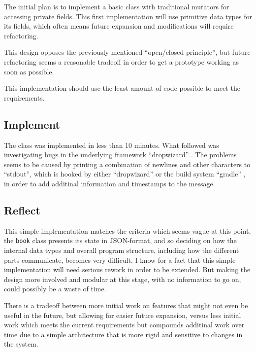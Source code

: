 The initial plan is to implement a basic class with traditional mutators for
accessing private fields. This first implementation will use primitive data
types for its fields, which often means future expansion and modifications will
require refactoring. 

This design opposes the previously mentioned ``open/closed principle'', but
future refactoring seems a reasonable tradeoff in order to get a prototype
working as soon as possible.

This implementation should use the least amount of code possible to meet the
requirements.




\subsection{Implement}\label{task-1a-implement}
The class was implemented in less than 10 minutes. What followed was
investigating bugs in the underlying framework ``dropwizard''
\cite{framework:dropwizard}.  The problems seems to be caused by printing a
combination of newlines and other characters to ``stdout'', which is hooked by
either ``dropwizard'' or the build system ``gradle'' \cite{tool:gradle}, in
order to add additinal information and timestamps to the message.


\subsection{Reflect}\label{task-1a-reflect}
This simple implementation matches the criteria which seems vague at this point,
the \texttt{book} class presents its state in JSON-format, and so deciding on
how the internal data types and overall program structure, including how
the different parts communicate, becomes very difficult.
I know for a fact that this simple implementation will need serious rework 
in order to be extended. But making the design more involved and modular
at this stage, with no information to go on, could possibly be a waste of time.

There is a tradeoff between more initial work on features that might not even
be useful in the future, but allowing for easier future expansion, versus less
initial work which meets the current requirements but compounds additinal work
over time due to a simple architecture that is more rigid and sensitive to
changes in the system.


